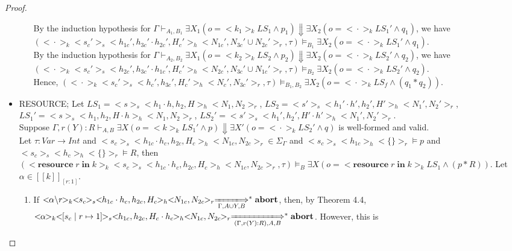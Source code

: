\documentclass{lmcs} %
\theoremstyle{plain}\newtheorem{satz}[thm]{Satz} %
\begin{document}
\begin{proof}
\begin{itemize}
\begin{enumerate}
      By the induction hypothesis for $\Gamma \vdash_{A_1,B_1} \exists X_1(o=<\!\!k_1\!\!>_k LS_1\land p_1)\Downarrow\exists X_2(o=<\!\!\cdot\!\!>_k LS_1'\land q_1)$, we have $(<\!\!\cdot\!\!>_k<\!\!s_c'\!\!>_s<\!\!h_{1c}',h_{3c}'\cdot h_{2c}' ,H_c'\!\!>_h<\!\!N_{1c}',N_{3c}'\cup N_{2c}'\!\!>_r,\tau)\models_{B_1} \exists X_2(o=<\!\!\cdot\!\!>_k LS_1'\land q_1)$.\\
      By the induction hypothesis for $\Gamma \vdash_{A_2,B_2} \exists X_1(o=<\!\!k_2\!\!>_k LS_2\land p_2)\Downarrow\exists X_2(o=<\!\!\cdot\!\!>_k LS_2'\land q_2)$, we have $(<\!\!\cdot\!\!>_k<\!\!s_c'\!\!>_s<\!\!h_{2c}',h_{3c}'\cdot h_{1c}' ,H_c'\!\!>_h<\!\!N_{2c}',N_{3c}'\cup N_{1c}'\!\!>_r,\tau)\models_{B_2} \exists X_2(o=<\!\!\cdot\!\!>_k LS_2'\land q_2)$.\\
      Hence, $(<\!\!\cdot\!\!>_k<\!\!s_c'\!\!>_s<\!\!h_{c}',h_{3c}',H_c'\!\!>_h<\!\!N_{c}',N_{3c}'\!\!>_r,\tau)\models_{B_1,B_2}\exists X_2 (o=<\!\!\cdot\!\!>_k LS_f\land (q_1* q_2))$.
       \end{enumerate}
  \item  RESOURCE; Let $LS_1=<\!\!s\!\!>_s<\!\!h_1\cdot h,h_2,H\!\!>_h<\!\!N_1,N_2\!\!>_r$, $LS_2=<\!\!s'\!\!>_s<\!\!h_1'\cdot h',h_2',H'\!\!>_h<\!\!N_1',N_2'\!\!>_r$, $LS_1'=<\!\!s\!\!>_s<\!\!h_1,h_2,H\cdot h\!\!>_h<\!\!N_1,N_2\!\!>_r$, $LS_2'=<\!\!s'\!\!>_s<\!\!h_1',h_2',H'\cdot h'\!\!>_h<\!\!N_1',N_2'\!\!>_r$.\\
      Suppose $\Gamma,r(Y):R \vdash_{A,B} \exists X(o=<\!\!k\!\!>_k LS_1'\land p )\Downarrow \exists X'(o=<\!\!\cdot\!\!>_k LS_2'\land q)$ is well-formed and valid.\\
       Let $\tau:\mathit{Var}\to Int$ and $<\!\!s_c\!\!>_s<\!\!h_{1c}\cdot h_c,h_{2c},H_c\!\!>_h<\!\!N_{1c},N_{2c}\!\!>_r\in \Sigma_\Gamma$ and $<\!\!s_c\!\!>_s<\!\!h_{1c}\!\!>_h<\!\!\{\}\!\!>_r\models p$ and $<\!\!s_c\!\!>_s<\!\!h_{c}\!\!>_h<\!\!\{\}\!\!>_r\models R$, then
       $(<\!\!\mathbf{resource}\;r\;\mathbf{in}\;k\!\!>_k<\!\!s_c\!\!>_s<\!\!h_{1c}\cdot h_c,h_{2c},H_c\!\!>_h<\!\!N_{1c},N_{2c}\!\!>_r,\tau)\models_{B} \exists X(o=<\!\!\mathbf{resource}\;r\;\mathbf{in}\;k\!\!>_k LS_1\land (p*R))$.
       Let $\alpha\in [\![k]\!]_{[r:1]}$.
       \begin{enumerate}
         \item If $<\!\!\alpha\backslash r\!\!>_k<\!\!s_c\!\!>_s<\!\!h_{1c}\cdot h_c,h_{2c},H_c\!\!>_h<\!\!N_{1c},N_{2c}\!\!>_r\xLongrightarrow[\Gamma, A\cup Y, B]{}^*\mathbf{abort}$, then, by Theorem 4.4, $<\!\!\alpha\!\!>_k<\!\![s_c\mid r\mapsto 1]\!\!>_s<\!\!h_{1c},h_{2c},H_c\cdot h_c\!\!>_h<\!\!N_{1c},N_{2c}\!\!>_r\xLongrightarrow[(\Gamma,r(Y):R), A, B]{}^*\mathbf{abort}$. However, this is

\end{enumerate}
\end{itemize}
\end{proof}
\end{document}
